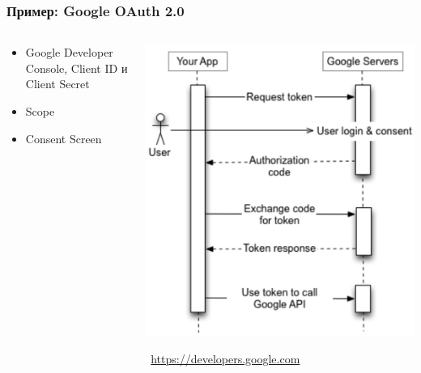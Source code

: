 \documentclass[xetex,mathserif,serif]{beamer}
\newcommand{\attribution}[1] {
\vspace{-5mm}\begin{flushright}\begin{scriptsize}\textcolor{gray}{\textcopyright\, #1}\end{scriptsize}\end{flushright}
}
\begin{document}
    \begin{frame}
        \frametitle{Пример: Google OAuth 2.0}
        \begin{columns}
            \begin{column}{0.5\textwidth}
                \begin{itemize}
                    \item Google Developer Console, Client ID и Client Secret
                    \item Scope
                    \item Consent Screen
                \end{itemize}
            \end{column}
            \begin{column}{0.4\textwidth}
                \begin{center}
                    \includegraphics[width=\textwidth]{googleOAuth.png}
                    \attribution{\url{https://developers.google.com}}
                \end{center}
            \end{column}
        \end{columns}
    \end{frame}
\end{document}
